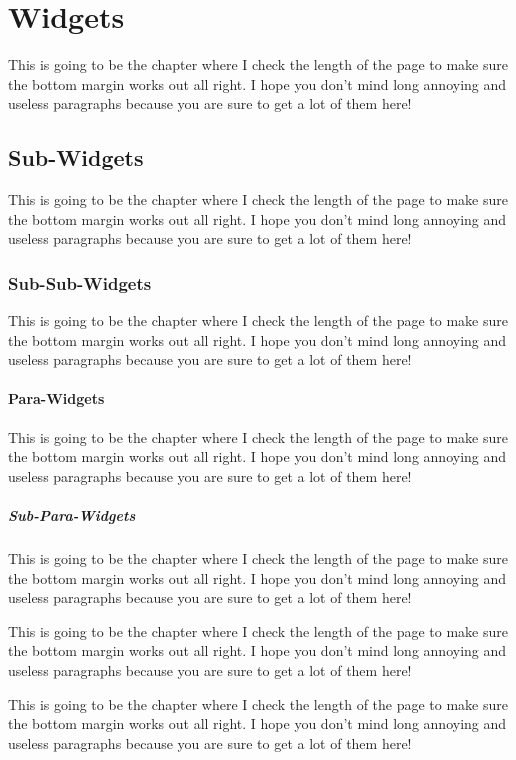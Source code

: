 \section{Widgets}

This is going to be the chapter where I check the length of the page
to make sure the bottom margin works out all right.  I hope you don't
mind long annoying and useless paragraphs because you are sure to get
a lot of them here!

\subsection{Sub-Widgets}

This is going to be the chapter where I check the length of the page
to make sure the bottom margin works out all right.  I hope you don't
mind long annoying and useless paragraphs because you are sure to get
a lot of them here!

\subsubsection{Sub-Sub-Widgets}

This is going to be the chapter where I check the length of the page
to make sure the bottom margin works out all right.  I hope you don't
mind long annoying and useless paragraphs because you are sure to get
a lot of them here!

\paragraph{Para-Widgets}

This is going to be the chapter where I check the length of the page
to make sure the bottom margin works out all right.  I hope you don't
mind long annoying and useless paragraphs because you are sure to get
a lot of them here!

\subparagraph{Sub-Para-Widgets}

This is going to be the chapter where I check the length of the page
to make sure the bottom margin works out all right.  I hope you don't
mind long annoying and useless paragraphs because you are sure to get
a lot of them here!

This is going to be the chapter where I check the length of the page
to make sure the bottom margin works out all right.  I hope you don't
mind long annoying and useless paragraphs because you are sure to get
a lot of them here!

This is going to be the chapter where I check the length of the page
to make sure the bottom margin works out all right.  I hope you don't
mind long annoying and useless paragraphs because you are sure to get
a lot of them here!

